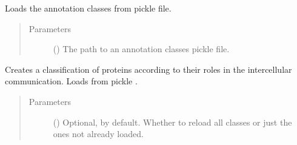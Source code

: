 \documentclass[letterpaper,10pt,english]{sphinxmanual}
\begin{document}
\begin{fulllineitems}
\begin{fulllineitems}
\begin{quote}
\begin{description}
\end{description}\end{quote}

\end{fulllineitems}


\begin{fulllineitems}
\label{\detokenize{reference:pypath.annot.CustomAnnotation.load_from_pickle}}
Loads the annotation classes from pickle file.
\begin{quote}\begin{description}
\item[{Parameters}] \leavevmode
{} () \textendash{} The path to an annotation classes pickle file.

\end{description}\end{quote}

\end{fulllineitems}


\begin{fulllineitems}
\label{\detokenize{reference:pypath.annot.CustomAnnotation.populate_classes}}
Creates a classification of proteins according to their roles
in the intercellular communication. Loads from pickle
.
\begin{quote}\begin{description}
\item[{Parameters}] \leavevmode
{} () \textendash{} Optional,  by default. Whether to reload all
classes or just the ones not already loaded.

\end{description}\end{quote}


\end{fulllineitems}
\end{fulllineitems}
\end{document}
